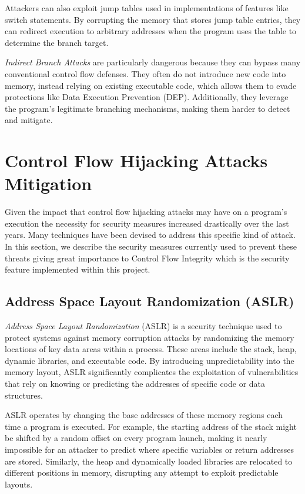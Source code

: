 Attackers can also exploit jump tables used in implementations of features like switch
statements. By corrupting the memory that stores jump table entries, they can redirect
execution to arbitrary addresses when the program uses the table to determine the
branch target.

\textit{Indirect Branch Attacks} are particularly dangerous because they can
bypass many conventional control flow defenses. They often do not introduce new code
into memory, instead relying on existing executable code, which allows them to evade
protections like Data Execution Prevention (DEP). Additionally, they leverage the
program's legitimate branching mechanisms, making them harder to detect and
mitigate.

\section{Control Flow Hijacking Attacks Mitigation}
\label{sec:background_mitigation}

Given the impact that control flow hijacking attacks may have on a program's execution
the necessity for security measures increased drastically over the last years.
Many techniques have been devised to address this specific kind of attack. In this
section, we describe the security measures currently used to prevent these
threats giving great importance to Control Flow Integrity which is the security
feature implemented within this project.

\subsection{Address Space Layout Randomization (ASLR)}
\label{subsec:background_aslr}

\textit{Address Space Layout Randomization} (ASLR) is a security technique used
to protect systems against memory corruption attacks by randomizing the memory
locations of key data areas within a process. These areas include the stack,
heap, dynamic libraries, and executable code. By introducing unpredictability into
the memory layout, ASLR significantly complicates the exploitation of
vulnerabilities that rely on knowing or predicting the addresses of specific
code or data structures.

ASLR operates by changing the base addresses of these memory regions each time a
program is executed. For example, the starting address of the stack might be
shifted by a random offset on every program launch, making it nearly impossible for
an attacker to predict where specific variables or return addresses are stored.
Similarly, the heap and dynamically loaded libraries are relocated to different positions
in memory, disrupting any attempt to exploit predictable layouts.

